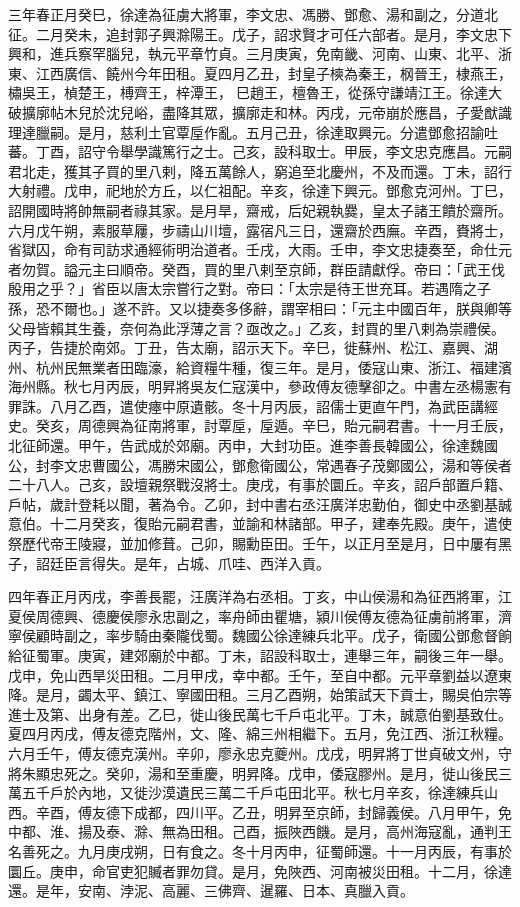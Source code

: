 \begin{pinyinscope}
三年春正月癸巳，徐達為征虜大將軍，李文忠、馮勝、鄧愈、湯和副之，分道北征。二月癸未，追封郭子興滁陽王。戊子，詔求賢才可任六部者。是月，李文忠下興和，進兵察罕腦兒，執元平章竹貞。三月庚寅，免南畿、河南、山東、北平、浙東、江西廣信、饒州今年田租。夏四月乙丑，封皇子樉為秦王，㭎晉王，棣燕王，橚吳王，楨楚王，榑齊王，梓潭王，巳趙王，檀魯王，從孫守謙靖江王。徐達大破擴廓帖木兒於沈兒峪，盡降其眾，擴廓走和林。丙戌，元帝崩於應昌，子愛猷識理達臘嗣。是月，慈利土官覃垕作亂。五月己丑，徐達取興元。分遣鄧愈招諭吐蕃。丁酉，詔守令舉學識篤行之士。己亥，設科取士。甲辰，李文忠克應昌。元嗣君北走，獲其子買的里八剌，降五萬餘人，窮追至北慶州，不及而還。丁未，詔行大射禮。戊申，祀地於方丘，以仁祖配。辛亥，徐達下興元。鄧愈克河州。丁巳，詔開國時將帥無嗣者祿其家。是月旱，齋戒，后妃親執爨，皇太子諸王饋於齋所。六月戊午朔，素服草屨，步禱山川壇，露宿凡三日，還齋於西廡。辛酉，賚將士，省獄囚，命有司訪求通經術明治道者。壬戌，大雨。壬申，李文忠捷奏至，命仕元者勿賀。謚元主曰順帝。癸酉，買的里八剌至京師，群臣請獻俘。帝曰：「武王伐殷用之乎？」省臣以唐太宗嘗行之對。帝曰：「太宗是待王世充耳。若遇隋之子孫，恐不爾也。」遂不許。又以捷奏多侈辭，謂宰相曰：「元主中國百年，朕與卿等父母皆賴其生養，奈何為此浮薄之言？亟改之。」乙亥，封買的里八剌為崇禮侯。丙子，告捷於南郊。丁丑，告太廟，詔示天下。辛巳，徙蘇州、松江、嘉興、湖州、杭州民無業者田臨濠，給資糧牛種，復三年。是月，倭寇山東、浙江、福建濱海州縣。秋七月丙辰，明昇將吳友仁寇漢中，參政傅友德擊卻之。中書左丞楊憲有罪誅。八月乙酉，遣使瘞中原遺骸。冬十月丙辰，詔儒士更直午門，為武臣講經史。癸亥，周德興為征南將軍，討覃垕，垕遁。辛巳，貽元嗣君書。十一月壬辰，北征師還。甲午，告武成於郊廟。丙申，大封功臣。進李善長韓國公，徐達魏國公，封李文忠曹國公，馮勝宋國公，鄧愈衛國公，常遇春子茂鄭國公，湯和等侯者二十八人。己亥，設壇親祭戰沒將士。庚戌，有事於圜丘。辛亥，詔戶部置戶籍、戶帖，歲計登耗以聞，著為令。乙卯，封中書右丞汪廣洋忠勤伯，御史中丞劉基誠意伯。十二月癸亥，復貽元嗣君書，並諭和林諸部。甲子，建奉先殿。庚午，遣使祭歷代帝王陵寢，並加修葺。己卯，賜勳臣田。壬午，以正月至是月，日中屢有黑子，詔廷臣言得失。是年，占城、爪哇、西洋入貢。

四年春正月丙戌，李善長罷，汪廣洋為右丞相。丁亥，中山侯湯和為征西將軍，江夏侯周德興、德慶侯廖永忠副之，率舟師由瞿塘，潁川侯傅友德為征虜前將軍，濟寧侯顧時副之，率步騎由秦隴伐蜀。魏國公徐達練兵北平。戊子，衛國公鄧愈督餉給征蜀軍。庚寅，建郊廟於中都。丁未，詔設科取士，連舉三年，嗣後三年一舉。戊申，免山西旱災田租。二月甲戌，幸中都。壬午，至自中都。元平章劉益以遼東降。是月，蠲太平、鎮江、寧國田租。三月乙酉朔，始策試天下貢士，賜吳伯宗等進士及第、出身有差。乙巳，徙山後民萬七千戶屯北平。丁未，誠意伯劉基致仕。夏四月丙戌，傅友德克階州，文、隆、綿三州相繼下。五月，免江西、浙江秋糧。六月壬午，傅友德克漢州。辛卯，廖永忠克夔州。戊戌，明昇將丁世貞破文州，守將朱顯忠死之。癸卯，湯和至重慶，明昇降。戊申，倭寇膠州。是月，徙山後民三萬五千戶於內地，又徙沙漠遺民三萬二千戶屯田北平。秋七月辛亥，徐達練兵山西。辛酉，傅友德下成都，四川平。乙丑，明昇至京師，封歸義侯。八月甲午，免中都、淮、揚及泰、滁、無為田租。己酉，振陜西饑。是月，高州海寇亂，通判王名善死之。九月庚戌朔，日有食之。冬十月丙申，征蜀師還。十一月丙辰，有事於圜丘。庚申，命官吏犯贓者罪勿貸。是月，免陜西、河南被災田租。十二月，徐達還。是年，安南、浡泥、高麗、三佛齊、暹羅、日本、真臘入貢。


\end{pinyinscope}

